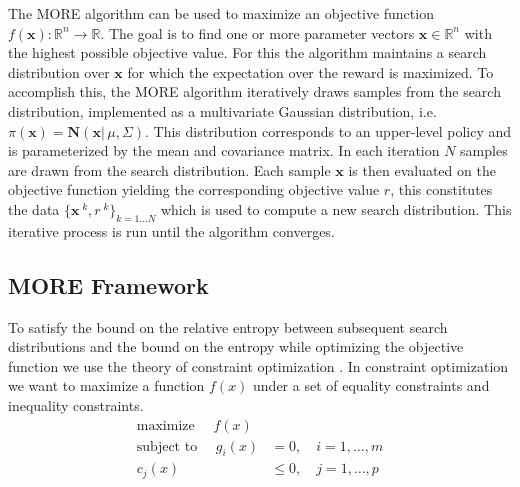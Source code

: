 The MORE algorithm can be used to maximize an objective function
$f(\mathbf{x}): \mathbb{R}^n \rightarrow \mathbb{R}$. The goal is
to find one or more parameter vectors $\mathbf{x} \in \mathbb{R}^n$ with the
highest possible objective value. For this the algorithm maintains
a search distribution over $\mathbf{x}$ for which the
expectation over the reward is maximized. To accomplish this, the
MORE algorithm iteratively draws samples from the search
distribution, implemented
as a multivariate Gaussian distribution, i.e.
$\pi(\mathbf{x}) = \mathbf{N}(\mathbf{x} |\, \mu, \Sigma)$.
This distribution corresponds to an upper-level policy
and is parameterized by the mean and covariance matrix.
In each iteration $N$ samples are drawn from the
search distribution. Each sample $\mathbf{x}$ is then
evaluated on the objective function yielding the corresponding
objective value $r$, this constitutes the data
$\{\mathbf{x}^{\;k}, r^{\;k}\}_{k=1...N}$ which is
used to compute a new search distribution.
This iterative process is run until the algorithm converges.


\subsection{MORE Framework}
To satisfy the bound on the relative entropy between subsequent
search distributions and the bound on the entropy while
optimizing the objective function
we use the theory of constraint optimization \citep{boyd2004convex}.
In constraint optimization we want to maximize a function
$f(x)$ under a set of equality constraints and inequality constraints.
\begin{equation}
  \label{eq:constraint}
  \begin{aligned}
    \text{maximize } \quad f(x)& \\
    \text{subject to } \quad g_i(x)& = 0, \quad i = 1, \dots, m\\
    c_j(x)& \leq 0, \quad j = 1, \dots, p
  \end{aligned}                       
\end{equation}

